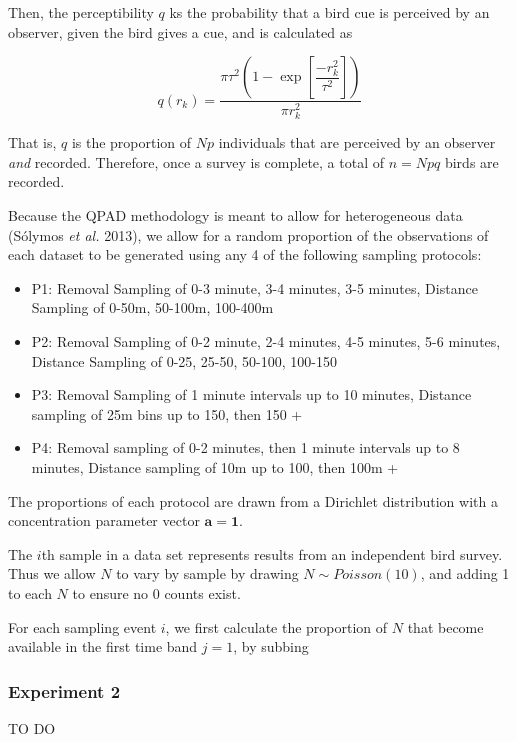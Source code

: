 \documentclass[
  11pt,
]{article}
\providecommand{\tightlist}{%
  \setlength{\itemsep}{0pt}\setlength{\parskip}{0pt}}
\begin{document}
Then, the perceptibility \(q\) ks the probability that a bird cue is
perceived by an observer, given the bird gives a cue, and is calculated
as

\[
  q(r_k) = \dfrac{\pi\tau^2\left(1-\exp\left[\dfrac{-r_k^2}{\tau^2}\right]\right)}{\pi r_k^2}  
\]

That is, \(q\) is the proportion of \(Np\) individuals that are
perceived by an observer \emph{and} recorded. Therefore, once a survey
is complete, a total of \(n = Npq\) birds are recorded.

Because the QPAD methodology is meant to allow for heterogeneous data
(Sólymos \emph{et al.} 2013), we allow for a random proportion of the
observations of each dataset to be generated using any 4 of the
following sampling protocols:

\begin{itemize}
\tightlist
\item
  P1: Removal Sampling of 0-3 minute, 3-4 minutes, 3-5 minutes, Distance
  Sampling of 0-50m, 50-100m, 100-400m
\item
  P2: Removal Sampling of 0-2 minute, 2-4 minutes, 4-5 minutes, 5-6
  minutes, Distance Sampling of 0-25, 25-50, 50-100, 100-150
\item
  P3: Removal Sampling of 1 minute intervals up to 10 minutes, Distance
  sampling of 25m bins up to 150, then 150 +
\item
  P4: Removal sampling of 0-2 minutes, then 1 minute intervals up to 8
  minutes, Distance sampling of 10m up to 100, then 100m +
\end{itemize}

The proportions of each protocol are drawn from a Dirichlet distribution
with a concentration parameter vector \(\mathbf{a} = \mathbf{1}\).

The \(i\)th sample in a data set represents results from an independent
bird survey. Thus we allow \(N\) to vary by sample by drawing
\(N\sim Poisson(10)\), and adding 1 to each \(N\) to ensure no 0 counts
exist.

For each sampling event \(i\), we first calculate the proportion of
\(N\) that become available in the first time band \(j = 1\), by subbing

\hypertarget{experiment-2}{%
\subsubsection{Experiment 2}\label{experiment-2}}

TO DO
\end{document}
